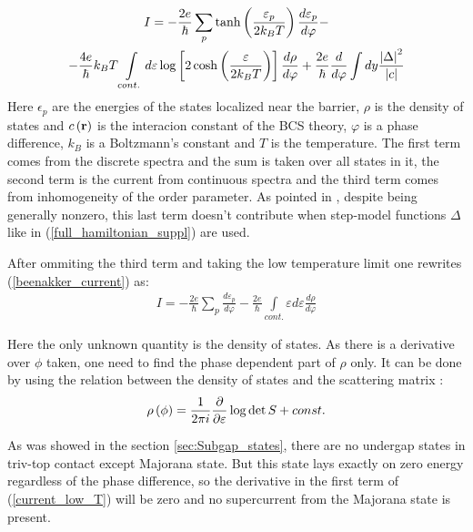 \begin{multline}
\label{beenakker_current}
	I =
	-
	\frac{2e}{\hbar}
	\sum_p
	\tanh\left(\frac{\varepsilon_p}{2k_BT}\right)
	\frac{d \varepsilon_p}{d\varphi}
	-
	\\
	-
	\frac{4e}{\hbar}
k_BT
	\int\limits_{cont.}d\varepsilon \log
	\left[
		2\cosh\left(\frac{\varepsilon}{2k_BT}\right)
	\right]
	\frac{d\rho}{d\varphi}
	+
	\frac{2e}{\hbar}
	\frac{d}{d\varphi}
	\int
	d y
		\frac{\left|\Delta\right|^2}{\left| c\right|}
\end{multline}
Here $ \epsilon_p $ are the energies of the states localized near the barrier, $ \rho$ is the density of states and $ c\left(\textbf{r}\right) $ is the interacion constant of the BCS theory, $ \varphi $ is a phase difference, $ k_B $ is a Boltzmann's constant and $ T $ is the temperature.
The first term comes from the discrete spectra and the sum is taken over all states in it, the second term is the current from continuous spectra and the third  term comes from inhomogeneity of the order parameter. As pointed in \cite{Beenakker_three_universal}, despite being generally nonzero, this last term doesn't contribute when step-model functions $ \Delta $ like in (\ref{full_hamiltonian_suppl})  are used.

After ommiting the third term and taking the low temperature limit one rewrites (\ref{beenakker_current}) as:
\begin{gather}
\label{current_low_T}
		I =
		-
	\frac{2e}{\hbar}
	\sum_p
	\frac{d \varepsilon_p}{d\varphi}
	-
	\frac{2e}{\hbar}
	\int\limits_{cont.}\varepsilon d\varepsilon 
	\frac{d\rho}{d\varphi}
\end{gather}

Here the only unknown quantity  is the density of states. As there is a derivative over $ \phi $ taken, one need to find the phase dependent part of $\rho  $ only. It can be done by using the relation between the density of states and the scattering matrix \cite{Akkermans_Avron_Shapiro_scattering_matrix}:
\begin{gather}
\label{smatrix_and_DOS}
	\rho\left(\phi\right)=\frac{1}{2\pi i}\frac{\partial}{\partial \varepsilon}\log \det S +const.
\end{gather}

As was showed in the section \ref{sec:Subgap_states}, there are no undergap states in triv-top contact except Majorana state. But this state lays exactly on zero energy regardless of the phase difference, so the derivative in the first term of (\ref{current_low_T}) will be zero and no supercurrent from the Majorana state is present.

